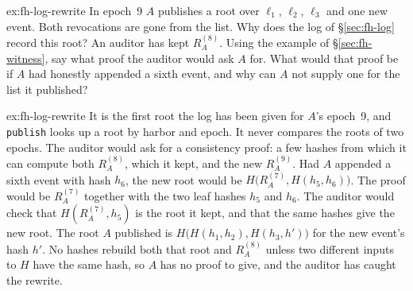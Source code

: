 \documentclass[11pt,a4paper]{article}
\theoremstyle{definition}
\theoremstyle{remark}
\begin{document}
\begin{pdexercise}[kind=Trace,rating=2]{ex:fh-log-rewrite}
In epoch~9 $A$ publishes a root over $\ell_1$, $\ell_2$, $\ell_3$ and one
new event. Both revocations are gone from the list. Why does the log of
\S\ref{sec:fh-log} record this root? An auditor has kept $R_A^{(8)}$.
Using the example of \S\ref{sec:fh-witness}, say what proof the auditor
would ask $A$ for. What would that proof be if $A$ had honestly appended
a sixth event, and why can $A$ not supply one for the list it published?
\end{pdexercise}
\begin{pdsolution}{ex:fh-log-rewrite}
It is the first root the log has been given for $A$'s epoch~9, and
\texttt{publish} looks up a root by harbor and epoch. It never compares
the roots of two epochs. The auditor would ask for a consistency proof: a
few hashes from which it can compute both $R_A^{(8)}$, which it kept, and
the new $R_A^{(9)}$. Had $A$ appended a sixth event with hash $h_6$, the
new root would be $H\bigl(R_A^{(7)},H(h_5,h_6)\bigr)$. The proof would be
$R_A^{(7)}$ together with the two leaf hashes $h_5$ and $h_6$. The
auditor would check that $H(R_A^{(7)},h_5)$ is the root it kept, and that
the same hashes give the new root. The root $A$ published is $H\bigl(H(h_1,h_2),H(h_3,h')\bigr)$
for the new event's hash $h'$. No hashes rebuild both that root and
$R_A^{(8)}$ unless two different inputs to $H$ have the same hash, so
$A$ has no proof to give, and the auditor has caught the rewrite.
\end{pdsolution}
\end{document}
